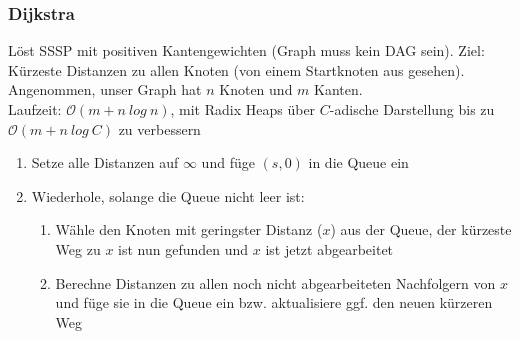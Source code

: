 \documentclass[12pt,a4paper]{article}
\begin{document}
\subsubsection{Dijkstra}
Löst SSSP mit positiven Kantengewichten (Graph muss kein DAG sein). Ziel: Kürzeste Distanzen zu allen Knoten (von einem Startknoten aus gesehen).\\
Angenommen, unser Graph hat $n$ Knoten und $m$ Kanten.\\
Laufzeit: $\mathcal{O}(m+n~log~n)$, mit Radix Heaps über $C$-adische Darstellung bis zu $\mathcal{O}(m+n~log~C)$ zu verbessern\\
\begin{enumerate}
\item Setze alle Distanzen auf $\infty$ und füge $(s,0)$ in die Queue ein
\item Wiederhole, solange die Queue nicht leer ist:\begin{enumerate}
\item Wähle den Knoten mit geringster Distanz ($x$) aus der Queue, der kürzeste Weg zu $x$ ist nun gefunden und $x$ ist jetzt abgearbeitet
\item Berechne Distanzen zu allen noch nicht abgearbeiteten Nachfolgern von $x$ und füge sie in die Queue ein bzw. aktualisiere ggf. den neuen kürzeren Weg
\end{enumerate}
\end{enumerate}
\end{document}
